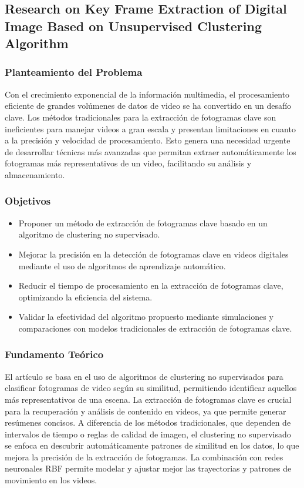 \subsection{Research on Key Frame Extraction of Digital Image Based on Unsupervised Clustering Algorithm}
\cite{wang2023keyframe}
\subsubsection{Planteamiento del Problema}
Con el crecimiento exponencial de la información multimedia, el procesamiento eficiente de grandes volúmenes de datos de video se ha convertido en un desafío clave. Los métodos tradicionales para la extracción de fotogramas clave son ineficientes para manejar videos a gran escala y presentan limitaciones en cuanto a la precisión y velocidad de procesamiento. Esto genera una necesidad urgente de desarrollar técnicas más avanzadas que permitan extraer automáticamente los fotogramas más representativos de un video, facilitando su análisis y almacenamiento.
\subsubsection{Objetivos}
\begin{itemize}
	\item Proponer un método de extracción de fotogramas clave basado en un algoritmo de clustering no supervisado.
	\item Mejorar la precisión en la detección de fotogramas clave en videos digitales mediante el uso de algoritmos de aprendizaje automático.
	\item Reducir el tiempo de procesamiento en la extracción de fotogramas clave, optimizando la eficiencia del sistema.
	\item Validar la efectividad del algoritmo propuesto mediante simulaciones y comparaciones con modelos tradicionales de extracción de fotogramas clave.
\end{itemize}
\subsubsection{Fundamento Teórico}
El artículo se basa en el uso de algoritmos de clustering no supervisados para clasificar fotogramas de video según su similitud, permitiendo identificar aquellos más representativos de una escena. La extracción de fotogramas clave es crucial para la recuperación y análisis de contenido en videos, ya que permite generar resúmenes concisos. A diferencia de los métodos tradicionales, que dependen de intervalos de tiempo o reglas de calidad de imagen, el clustering no supervisado se enfoca en descubrir automáticamente patrones de similitud en los datos, lo que mejora la precisión de la extracción de fotogramas. La combinación con redes neuronales RBF permite modelar y ajustar mejor las trayectorias y patrones de movimiento en los videos.
